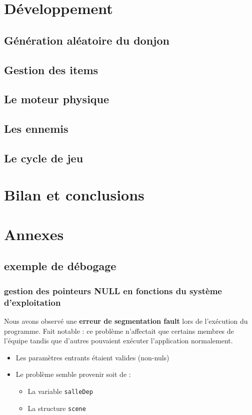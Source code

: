 \documentclass[a4paper,11pt]{article}
\begin{document}
\section{Développement}

\subsection{Génération aléatoire du donjon}

\subsection{Gestion des items}

\subsection{Le moteur physique}

\subsection{Les ennemis}

\subsection{Le cycle de jeu}

\section{Bilan et conclusions}

\section{Annexes}

\subsection{exemple de débogage}
\subsubsection{gestion des pointeurs NULL en fonctions du système d'exploitation}
Nous avons observé une \textbf{erreur de segmentation fault} lors de l'exécution du programme. Fait notable : ce problème n'affectait que certains membres de l'équipe tandis que d'autres pouvaient exécuter l'application normalement.

\begin{itemize}
    \item Les paramètres entrants étaient valides (non-nuls)
    \item Le problème semble provenir soit de :
    \begin{itemize}
        \item La variable \texttt{salleDep}
        \item La structure \texttt{scene}
    \end{itemize}
\end{itemize}
\end{document}

